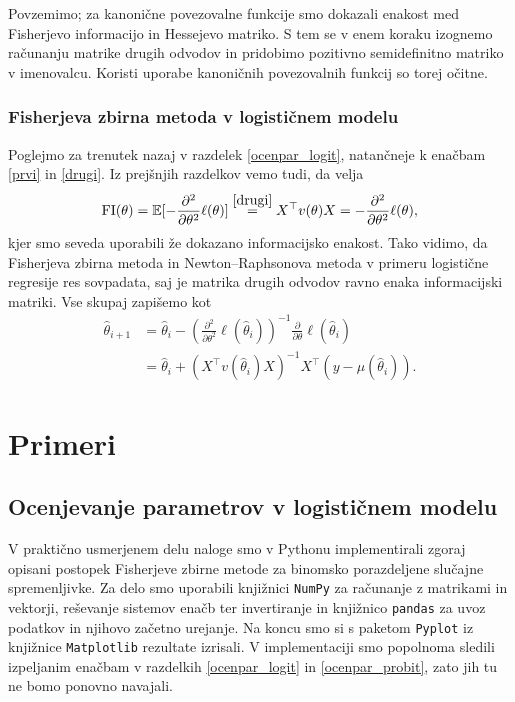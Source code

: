 \documentclass[12pt,a4paper]{amsart}
\theoremstyle{definition} %
\theoremstyle{plain} %
\begin{document}
Povzemimo; za kanonične povezovalne funkcije smo dokazali enakost med Fisherjevo informacijo in Hessejevo matriko. S tem se v enem koraku izognemo računanju matrike drugih 
odvodov in pridobimo pozitivno semidefinitno matriko v imenovalcu. Koristi uporabe kanoničnih povezovalnih funkcij so torej očitne.

\subsubsection{Fisherjeva zbirna metoda  v logističnem modelu}
Poglejmo za trenutek nazaj v razdelek \ref{ocenpar_logit}, natančneje k enačbam \eqref{prvi} in \eqref{drugi}. Iz prejšnjih razdelkov vemo tudi, da velja
\[
    \mathrm{FI}(\theta) = \mathbb{E}[-\frac{\partial^2}{\partial\theta^2} \ell(\theta)] \overset{\eqref{drugi}}{=} X^\top v(\theta)X = -\frac{\partial^2}{\partial\theta^2} \ell(\theta),
\]
kjer smo seveda uporabili že dokazano informacijsko enakost. Tako vidimo, da Fisherjeva zbirna metoda in Newton--Raphsonova metoda v primeru logistične regresije
res sovpadata, saj je matrika drugih odvodov ravno enaka informacijski matriki. Vse skupaj zapišemo kot
\begin{align}
    \hat{\theta}_{i+1} &= \hat{\theta}_{i} - (\frac{\partial^2}{\partial\theta^2} \ell(\hat{\theta}_{i}))^{-1} \frac{\partial}{\partial\theta} \ell(\hat{\theta}_{i}) \nonumber \\
    &= \hat{\theta}_{i} + (X^\top v(\hat{\theta}_{i}) X)^{-1}X^\top(y - \mu(\hat{\theta}_{i})).
\end{align}

\section{Primeri}
\subsection{Ocenjevanje parametrov v logističnem modelu}

V praktično usmerjenem delu naloge smo v Pythonu implementirali zgoraj opisani postopek Fisherjeve zbirne metode za binomsko porazdeljene slučajne
spremenljivke. Za delo smo uporabili knjižnici \texttt{NumPy} za računanje z matrikami in vektorji, reševanje sistemov enačb ter invertiranje in
knjižnico \texttt{pandas} za uvoz podatkov in njihovo začetno urejanje. Na koncu smo si s paketom \texttt{Pyplot} iz knjižnice \texttt{Matplotlib} rezultate izrisali.
V implementaciji smo popolnoma sledili izpeljanim enačbam v razdelkih \ref{ocenpar_logit} in \ref{ocenpar_probit}, zato jih tu ne bomo ponovno navajali.
\end{document}
